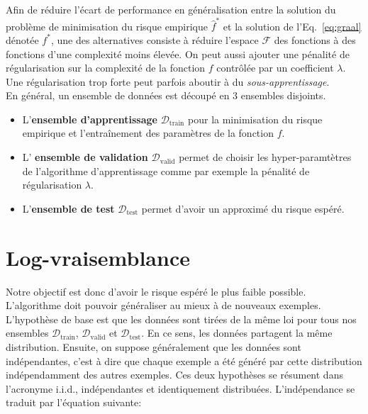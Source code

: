 Afin de réduire l'écart de performance en généralisation entre la solution du
problème de minimisation du risque empirique $\hat{f}^*$ et la solution de
l'Eq.~\ref{eq:graal} dénotée $f^*$, une des alternatives consiste à réduire
l'espace $\mathcal{F}$ des fonctions à des fonctions d'une complexité moins
élevée. On peut aussi ajouter une pénalité de régularisation sur la complexité
de la fonction $f$ contrôlée par un coefficient $\lambda$. Une régularisation
trop forte peut parfois aboutir à du \emph{sous-apprentissage}.  \\

En général, un ensemble de données est découpé en $3$ ensembles disjoints.


\begin{itemize}

\item L'{\bf ensemble d'apprentissage} $\mathcal{D}_\textrm{train}$ pour la
minimisation du risque empirique et l'entraînement des paramètres de la
fonction $f$.

\item L' {\bf ensemble de validation} $\mathcal{D_{\mathrm{valid}}}$ permet de
choisir les hyper-paramtètres de l'algorithme d'apprentissage comme par exemple
la pénalité de régularisation $\lambda$.

\item L'{\bf ensemble de test} $\mathcal{D_{\mathrm{test}}}$  permet d'avoir un
approximé du risque espéré.

\end{itemize}

\section{Log-vraisemblance}

Notre objectif est donc d'avoir le risque espéré le plus faible possible.
L'algorithme doit pouvoir généraliser au mieux à de nouveaux exemples.
L'hypothèse de base est que les données sont tirées de la même loi pour tous
nos ensembles $\mathcal{D}_\textrm{train}$, $\mathcal{D_{\mathrm{valid}}}$ et
$\mathcal{D_{\mathrm{test}}}$. En ce sens, les données partagent la même
distribution.  Ensuite, on suppose généralement que les données sont
indépendantes, c'est à dire que chaque exemple a été généré par cette
distribution indépendamment des autres exemples.  Ces deux hypothèses
se résument dans l'acronyme i.i.d., indépendantes et identiquement distribuées.
L'indépendance se traduit par l'équation suivante:

